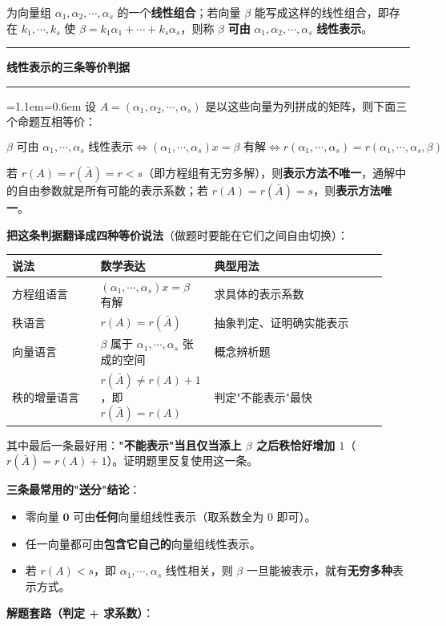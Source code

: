 \documentclass[11pt,openany,UTF8]{ctexbook}
\newcommand{\callouthead}[2]{%
  \par\addvspace{7pt}\noindent
  {\color{#1}\rule[-0.15em]{3pt}{1.05em}}\hspace{0.5em}%
  {\bfseries\color{#1}#2}\par\nobreak\vspace{-0.35em}%
  {\color{rulesep}\hrule height 0.4pt}\nobreak\vspace{0.45em}%
  \begingroup\small\setlength{\parindent}{0pt}%
  \leftskip=1.1em\rightskip=0.6em\noindent\ignorespaces}
\newcommand{\calloutend}{\par\endgroup\addvspace{7pt}}
\newenvironment{callkey}[1]{\callouthead{keybar}{#1}}{\calloutend}
\begin{document}
为向量组 $\alpha_1,\alpha_2,\cdots,\alpha_s$ 的一个\textbf{线性组合}；若向量 $\beta$ 能写成这样的线性组合，即存在 $k_1,\cdots,k_s$ 使 $\beta=k_1\alpha_1+\cdots+k_s\alpha_s$，则称 $\beta$ \textbf{可由} $\alpha_1,\alpha_2,\cdots,\alpha_s$ \textbf{线性表示}。

\begin{callkey}{线性表示的三条等价判据}
设 $A=(\alpha_1,\alpha_2,\cdots,\alpha_s)$ 是以这些向量为列拼成的矩阵，则下面三个命题互相等价：

\[\beta \text{ 可由 } \alpha_1,\cdots,\alpha_s \text{ 线性表示}
\iff (\alpha_1,\cdots,\alpha_s)x=\beta \text{ 有解}
\iff r(\alpha_1,\cdots,\alpha_s)=r(\alpha_1,\cdots,\alpha_s,\beta)\]

若 $r(A)=r(\bar A)=r<s$（即方程组有无穷多解），则\textbf{表示方法不唯一}，通解中的自由参数就是所有可能的表示系数；若 $r(A)=r(\bar A)=s$，则\textbf{表示方法唯一}。

\textbf{把这条判据翻译成四种等价说法}（做题时要能在它们之间自由切换）：

\begingroup\small\setlength{\tabcolsep}{4.0pt}
\begin{longtable}{@{}L{0.2351\linewidth}L{0.2351\linewidth}L{0.4584\linewidth}@{}}
\toprule
\textbf{说法} & \textbf{数学表达} & \textbf{典型用法} \\
\midrule
\endhead
方程组语言 & $(\alpha_1,\cdots,\alpha_s)x=\beta$ 有解 & 求具体的表示系数 \\
秩语言 & $r(A)=r(\bar A)$ & 抽象判定、证明确实能表示 \\
向量语言 & $\beta$ 属于 $\alpha_1,\cdots,\alpha_s$ 张成的空间 & 概念辨析题 \\
秩的增量语言 & $r(\bar A)\ne r(A)+1$，即 $r(\bar A)=r(A)$ & 判定"不能表示"最快 \\
\bottomrule
\end{longtable}
\endgroup

其中最后一条最好用：\textbf{"不能表示"当且仅当添上 $\beta$ 之后秩恰好增加 $1$}（$r(\bar A)=r(A)+1$）。证明题里反复使用这一条。

\end{callkey}

\textbf{三条最常用的"送分"结论}：

\begin{itemize}
\item 零向量 $\mathbf{0}$ 可由\textbf{任何}向量组线性表示（取系数全为 $0$ 即可）。
\item 任一向量都可由\textbf{包含它自己的}向量组线性表示。
\item 若 $r(A)<s$，即 $\alpha_1,\cdots,\alpha_s$ 线性相关，则 $\beta$ 一旦能被表示，就有\textbf{无穷多种}表示方式。
\end{itemize}
\textbf{解题套路（判定 + 求系数）}：
\end{document}
